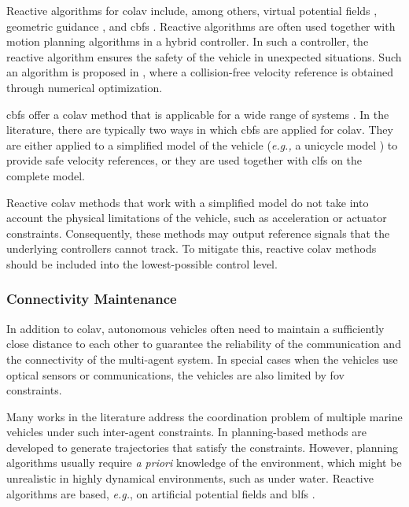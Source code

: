 Reactive algorithms for \gls{colav} include, among others, virtual potential fields \cite{roussos_3d_2008}, geometric guidance \cite{mujumdar_reactive_2011}, and \glspl{cbf} \cite{squires_constructive_2018,igarashi_collision_2018,romdlony_stabilization_2016,basso_safety-critical_2020,ames_control_2014}.
Reactive algorithms are often used together with motion planning algorithms in a hybrid controller.
In such a controller, the reactive algorithm ensures the safety of the vehicle in unexpected situations.
Such an algorithm is proposed in \cite{hedjar_automatic_2019}, where a collision-free velocity reference is obtained through numerical optimization.

\Glspl{cbf} offer a \gls{colav} method that is applicable for a wide range of systems \cite{ames_control_2019}.
In the literature, there are typically two ways in which \glspl{cbf} are applied for \gls{colav}.
They are either applied to a simplified model of the vehicle (\emph{e.g.,} a unicycle model \cite{squires_constructive_2018,igarashi_collision_2018}) to provide safe velocity references, or they are used together with \glspl{clf} \cite{romdlony_stabilization_2016,basso_safety-critical_2020,ames_control_2014} on the complete model.

Reactive \gls{colav} methods that work with a simplified model do not take into account the physical limitations of the vehicle, such as acceleration or actuator constraints.
Consequently, these methods may output reference signals that the underlying controllers cannot track.
To mitigate this, reactive \gls{colav} methods should be included into the lowest-possible control level.

\subsubsection{Connectivity Maintenance}
In addition to \gls{colav}, autonomous vehicles often need to maintain a sufficiently close distance to each other to guarantee the reliability of the communication and the connectivity of the multi-agent system.
In special cases when the vehicles use optical sensors or communications, the vehicles are also limited by \gls{fov} constraints.

Many works in the literature address the coordination problem of multiple marine vehicles under such inter-agent constraints. In \cite{gan2014online,gomes2018MPC} planning-based methods are developed to generate trajectories that satisfy the constraints. However, planning algorithms usually require \emph{a priori} knowledge of the environment, which might be unrealistic in highly dynamical environments, such as under water. Reactive algorithms are based, \emph{e.g.}, on artificial potential fields \cite{jia2007formation,brinon2010contraction} and \glspl{blf} \cite{gao2019velocity-free,naderolasli2023platoon}.
